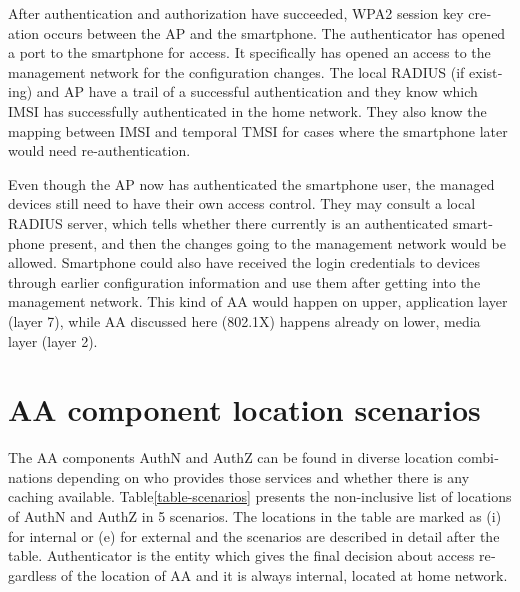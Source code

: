 \documentclass[12pt,a4paper,english]{tutthesis}
\begin{document}
\begin{otherlanguage}{english}
After authentication and authorization have succeeded, WPA2 session key
creation occurs between the AP and the smartphone. 
The authenticator has opened a port to the smartphone for
access. It specifically has opened an access to the management network for
the configuration changes. 
The local RADIUS (if existing) and AP have a trail of a successful
authentication and they know which IMSI has successfully authenticated in
the home network. They also know the mapping between IMSI and temporal TMSI for
cases where the smartphone later would need re-authentication.


Even though the AP now has authenticated the smartphone user, the managed devices still 
need to have their own access control.
They may consult a local RADIUS server, which tells whether there currently is an
authenticated smartphone present, and then the changes going
to the management network would be allowed. Smartphone could also have
received the login credentials to devices through earlier 
configuration information and use them after getting into the management
network. This kind of AA would happen on upper, application layer
(layer 7), while AA discussed here (802.1X) happens already on lower, media layer (layer 2).

\section{AA component location scenarios}
\label{sec-4-2}


The AA components AuthN and AuthZ can be found in diverse location
combinations
depending on who provides those services and whether there is any caching
available. 
Table\ref{table-scenarios} presents the non-inclusive list of locations of
AuthN and AuthZ in 5 scenarios. The locations in the table are marked as (i)
for internal or (e) for external and the scenarios are
described in detail after the table. Authenticator is the entity which
gives the final decision about access regardless of the location of AA
and it is always internal, located at home network. 


\end{otherlanguage}
\end{document}
